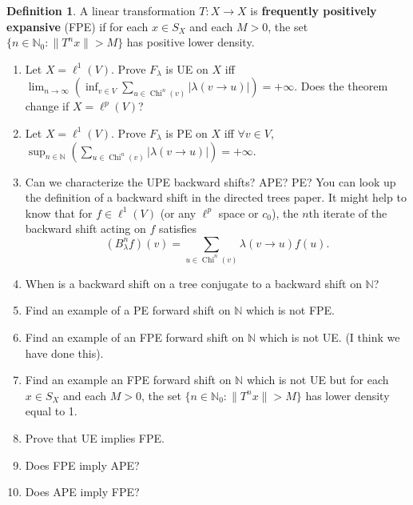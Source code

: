\documentclass{article}
\theoremstyle{definition}\newtheorem{remark}[theorem]{Remark}
\theoremstyle{definition}\newtheorem{example}[theorem]{Example}
\theoremstyle{definition}\newtheorem{fact}[theorem]{Fact}
\theoremstyle{definition}\newtheorem{diagram}[theorem]{Diagram}
\theoremstyle{definition}\newtheorem{definition}[theorem]{Definition}
\theoremstyle{definition}\newtheorem{question}[theorem]{Question}
\newcommand{\N}{\mathbb{N}}
\DeclareMathOperator{\Child}{Chi}
\begin{document}
\begin{definition}
A linear transformation $T:X\to X$ is {\bf frequently positively expansive} (FPE) if for each $x\in S_X$ and each $M>0$, the set $\{n\in \N_0: \|T^n x\|>M\}$ has positive lower density. 
\end{definition}
\begin{enumerate}
    \item Let $X=\ell^1(V)$. Prove $F_\lambda$ is UE on $X$ iff $\displaystyle\lim_{n\to \infty} \left(\inf_{v\in V} \sum_{u\in\Child^n(v)} |\lambda(v\to u)|\right)=+\infty$. Does the theorem change if $X=\ell^p(V)$?
    \item  Let $X=\ell^1(V)$. Prove $F_\lambda$ is PE on $X$ iff $\forall v\in V$, $\displaystyle\sup_{n\in \N} \left( \sum_{u\in\Child^n(v)} |\lambda(v\to u)|\right)=+\infty$.
    \item Can we characterize the UPE backward shifts? APE? PE? You can look up the definition of a backward shift in the directed trees paper. It might help to know that for $f\in \ell^1(V)$ (or any $\ell^p$ space or $c_0$), the $n$th iterate of the backward shift acting on $f$ satisfies
    \[(B_\lambda^n f)(v)=\sum_{u\in \Child^n(v)} \lambda(v\to u) f(u).\]
    \item When is a backward shift on a tree conjugate to a backward shift on $\N$?
    \item Find an example of a PE forward shift on $\N$ which is not FPE. 
    \item Find an example of an FPE forward shift on $\N$ which is not UE. (I think we have done this).
    \item Find an example an FPE forward shift on $\N$ which is not UE but for each $x\in S_X$ and each $M>0$, the set $\{n\in \N_0: \|T^n x\|>M\}$ has lower density equal to 1.
    \item Prove that UE implies FPE.
    \item Does FPE imply APE?
    \item Does APE imply FPE?
\end{enumerate}
\end{document}
